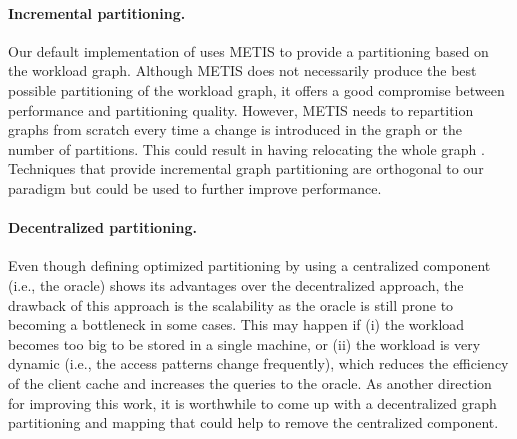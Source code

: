 \paragraph{Incremental partitioning.} Our default implementation of \dynastar
uses METIS \cite{Abou-Rjeili:2006} to provide a partitioning based on the
workload graph. Although METIS does not necessarily produce the best possible
partitioning of the workload graph, it offers a good compromise between
performance and partitioning quality. However, METIS needs to repartition graphs
from scratch every time a change is introduced in the graph or the number of
partitions. This could result in having \dynastar relocating the whole graph
\cite{SerafiniTEPAS16}. Techniques that provide incremental graph
partitioning are orthogonal to our paradigm but could be used to further
improve \dynastar performance.


\paragraph{Decentralized partitioning.} Even though defining optimized
partitioning by using a centralized component (i.e., the oracle) shows its
advantages over the decentralized approach, the drawback of this approach is the
scalability as the oracle is still prone to becoming a bottleneck in some cases.
This may happen if (i) the workload becomes too big to be stored in a single
machine, or (ii) the workload is very dynamic (i.e., the access patterns change 
frequently), which reduces the efficiency of the client cache and 
increases the queries to the oracle. As another direction for improving this
work, it is worthwhile to come up with a decentralized graph partitioning and
mapping that could help to remove the centralized component.
